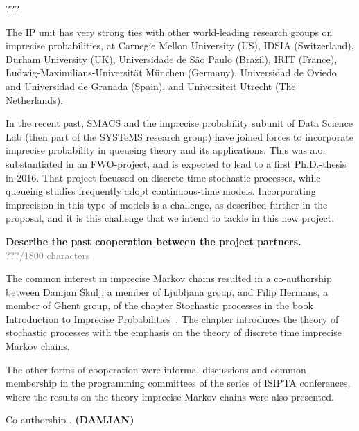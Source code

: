 \documentclass[11pt,dvipsnames,usenames,a4paper]{article}
\begin{document}
???


The IP unit has very strong ties with other world-leading research groups on imprecise probabilities, at Carnegie Mellon University (US), IDSIA (Switzerland), Durham University (UK), Universidade de S\~ao Paulo (Brazil), IRIT (France), Ludwig-Maximilians-Universit\"at M\"unchen (Germany), Universidad de Oviedo and Universidad de Granada (Spain), and Universiteit Utrecht (The Netherlands).

In the recent past, SMACS and the imprecise probability subunit of Data Science Lab (then part of the SYSTeMS research group) have  joined forces to incorporate imprecise probability in queueing theory and its applications. This was a.o. substantiated in an FWO-project, and is expected to lead to a first Ph.D.-thesis in 2016. That project focussed on discrete-time stochastic processes, while queueing studies frequently adopt continuous-time models. Incorporating imprecision in this type of models is a challenge, as described further in the proposal, and it is this challenge that we intend to tackle in this new project.

\textbf{Describe the past cooperation between the project partners.}\\
\textcolor{Gray}{???/1800 characters}

The common interest in imprecise Markov chains resulted in a co-authorship between Damjan Škulj, a member of Ljubljana group, and Filip Hermans, a member of Ghent group, of the chapter Stochastic processes in the book Introduction to Imprecise Probabilities~\cite{augustin2013:itip}. The chapter introduces the theory of stochastic processes with the emphasis on the theory of discrete time imprecise Markov chains. 

The other forms of cooperation were informal discussions and common membership in the programming committees of the series of ISIPTA conferences, where the results on the theory imprecise Markov chains were also presented. 



Co-authorship . {\color{blue}\bf (DAMJAN)}








\end{document}
